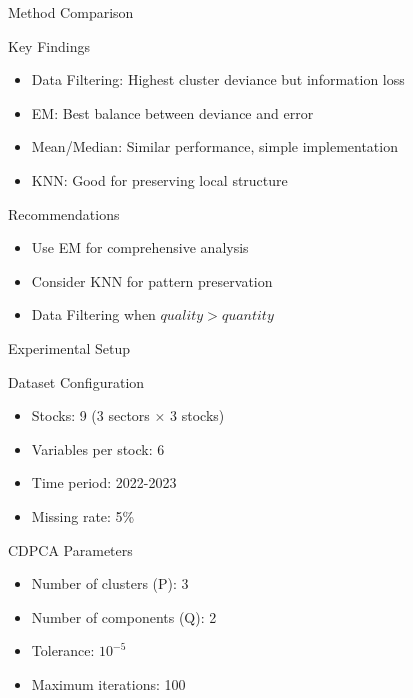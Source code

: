 \documentclass{beamer}
\begin{document}
\begin{frame}{Method Comparison}
    \begin{block}{Key Findings}
        \begin{itemize}
            \item Data Filtering: Highest cluster deviance but information loss
            \item EM: Best balance between deviance and error
            \item Mean/Median: Similar performance, simple implementation
            \item KNN: Good for preserving local structure
        \end{itemize}
    \end{block}

    \begin{block}{Recommendations}
        \begin{itemize}
            \item Use EM for comprehensive analysis
            \item Consider KNN for pattern preservation
            \item Data Filtering when $quality > quantity$
        \end{itemize}
    \end{block}
\end{frame}

\begin{frame}{Experimental Setup}
    \begin{block}{Dataset Configuration}
        \begin{itemize}
            \item Stocks: 9 (3 sectors × 3 stocks)
            \item Variables per stock: 6
            \item Time period: 2022-2023
            \item Missing rate: 5\%
        \end{itemize}
    \end{block}

    \begin{block}{CDPCA Parameters}
        \begin{itemize}
            \item Number of clusters (P): 3
            \item Number of components (Q): 2
            \item Tolerance: $10^{-5}$
            \item Maximum iterations: 100
        \end{itemize}
    \end{block}
\end{frame}
\end{document}
